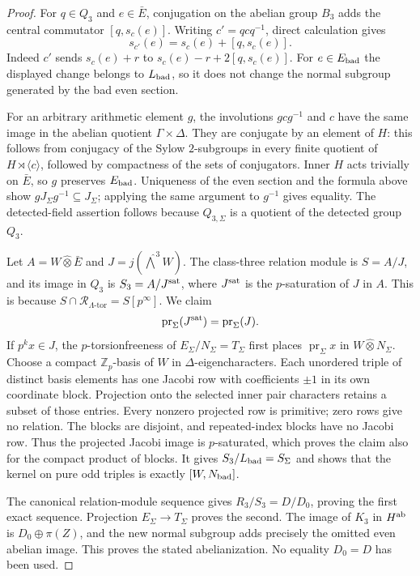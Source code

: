 \documentclass[11pt]{article}
\theoremstyle{definition}\newtheorem{definition}[theorem]{Definition}
\begin{document}
\begin{proof}
For $q\in Q_3$ and $e\in\bar E$, conjugation on the abelian
group $B_3$ adds the central commutator $[q,s_c(e)]$.
Writing $c'=qcq^{-1}$, direct calculation gives
\[
 s_{c'}(e)=s_c(e)+[q,s_c(e)].
\]
Indeed $c'$ sends $s_c(e)+r$ to
$s_c(e)-r+2[q,s_c(e)]$.  For $e\in E_{\rm bad}$ the displayed
change belongs to $L_{\rm bad}$, so it does not change the normal
subgroup generated by the bad even section.

For an arbitrary arithmetic element $g$, the involutions
$gcg^{-1}$ and $c$ have the same image in the abelian quotient
$\Gamma\times\Delta$.  They are conjugate by an element of $H$:
this follows from conjugacy of the Sylow $2$-subgroups in every
finite quotient of $H\rtimes\langle c\rangle$, followed by
compactness of the sets of conjugators.  Inner $H$ acts trivially
on $\bar E$, so $g$ preserves $E_{\rm bad}$.  Uniqueness of the
even section and the formula above show $gJ_\Sigma g^{-1}
\subseteq J_\Sigma$; applying the same argument to $g^{-1}$
gives equality.  The detected-field assertion follows because
$Q_{3,\Sigma}$ is a quotient of the detected group $Q_3$.

Let $A=W\widehat\otimes\bar E$ and
$J=j(\widehat\bigwedge^3W)$.  The class-three relation module
is $S=A/J$, and its image in $Q_3$ is
$S_3=A/J^{\rm sat}$, where $J^{\rm sat}$ is the $p$-saturation
of $J$ in $A$.  This is because
$S\cap\mathcal R_{\Lambda\text{-tor}}=S[p^\infty]$.
We claim
\[
 \operatorname{pr}_\Sigma(J^{\rm sat})
                 =\operatorname{pr}_\Sigma(J).
\]
If $p^kx\in J$, the $p$-torsionfreeness of
$E_\Sigma/N_\Sigma=T_\Sigma$ first places
$\operatorname{pr}_\Sigma x$ in $W\widehat\otimes N_\Sigma$.
Choose a compact $\mathbb Z_p$-basis of $W$ in
$\Delta$-eigencharacters.  Each unordered triple of distinct
basis elements has one Jacobi row with coefficients $\pm1$ in
its own coordinate block.  Projection onto the selected inner
pair characters retains a subset of those entries.  Every
nonzero projected row is primitive; zero rows give no relation.
The blocks are disjoint, and repeated-index blocks have no
Jacobi row.  Thus the projected Jacobi image is $p$-saturated,
which proves the claim also for the compact product of blocks.
It gives $S_3/L_{\rm bad}=S_\Sigma$ and shows that the kernel
on pure odd triples is exactly $[W,N_{\rm bad}]$.

The canonical relation-module sequence gives
$R_3/S_3=D/D_0$, proving the first exact sequence.  Projection
$E_\Sigma\to T_\Sigma$ proves the second.  The image of
$K_3$ in $H^{\rm ab}$ is $D_0\oplus\pi(Z)$, and the new
normal subgroup adds precisely the omitted even abelian image.
This proves the stated abelianization.  No equality $D_0=D$
has been used.


\end{proof}
\end{document}

